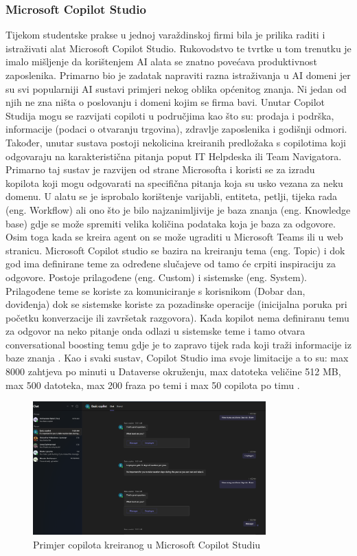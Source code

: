 \documentclass[]{foi}
\begin{document}
\subsubsection{Microsoft Copilot Studio}
Tijekom studentske prakse u jednoj varaždinskoj firmi bila je prilika raditi i istraživati alat Microsoft Copilot Studio. Rukovodstvo te tvrtke u tom trenutku je imalo mišljenje da korištenjem 
AI alata se znatno povećava produktivnost zaposlenika. Primarno bio je zadatak napraviti razna istraživanja u AI domeni jer su svi popularniji AI sustavi primjeri nekog oblika općenitog znanja. 
Ni jedan od njih ne zna ništa o poslovanju i domeni kojim se firma bavi. Unutar Copilot Studija mogu se razvijati copiloti u područjima kao što su: prodaja i podrška, informacije (podaci o otvaranju trgovina), 
zdravlje zaposlenika i godišnji odmori. Također, unutar sustava postoji nekolicina kreiranih predložaka s copilotima koji odgovaraju na karakteristična pitanja poput IT Helpdeska ili Team Navigatora. 
Primarno taj sustav je razvijen od strane Microsofta i koristi se za izradu kopilota koji mogu odgovarati na specifična pitanja koja su usko vezana za neku domenu. U alatu se je isprobalo korištenje varijabli, entiteta, 
petlji, tijeka rada (eng. Workflow) ali ono što je bilo najzanimljivije je baza znanja (eng. Knowledge base) gdje se može spremiti velika količina podataka koja je baza za odgovore. Osim toga kada se kreira agent on se može 
ugraditi u Microsoft Teams ili u web stranicu. Microsoft Copilot studio se bazira na kreiranju tema (eng. Topic) i dok god ima definirane teme za određene slučajeve od tamo će crpiti 
inspiraciju za odgovore. Postoje prilagođene (eng. Custom) i sistemske (eng. System). Prilagođene teme se koriste za komuniciranje s korisnikom (Dobar dan, doviđenja) dok se sistemske koriste
za pozadinske operacije (inicijalna poruka pri početku konverzacije ili završetak razgovora). Kada kopilot nema definiranu temu za odgovor na neko pitanje onda odlazi u sistemske teme i tamo 
otvara conversational boosting temu gdje je to zapravo tijek rada koji traži informacije iz baze znanja \cite{copilot2025}. Kao i svaki sustav, Copilot Studio ima svoje limitacije 
a to su: max 8000 zahtjeva po minuti u Dataverse okruženju, max datoteka veličine 512 MB, max 500 datoteka, max 200 fraza po temi i max 50 copilota po timu \cite{quotas2025}.

\begin{figure}[ht!]
    \centering
    \includegraphics[width=0.8\textwidth]{./assets/Primjer_agenta_kreiranog_u_Copilot_Studiu.png} 
    \caption{Primjer copilota kreiranog u Microsoft Copilot Studiu}
    \label{fig:slika2}
\end{figure}
\end{document}
